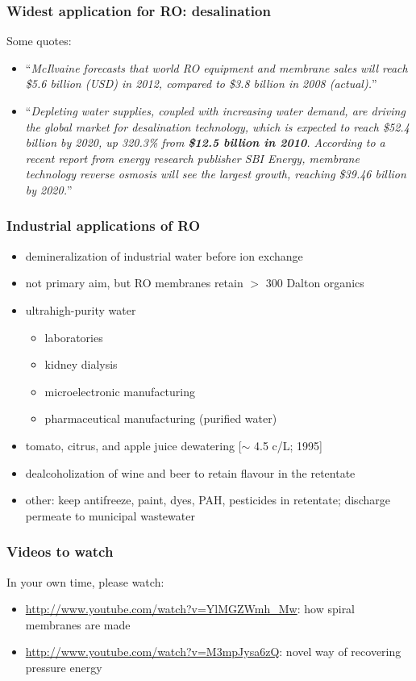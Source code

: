 \begin{frame}\frametitle{Widest application for RO: desalination}
	Some quotes:
	\begin{itemize}
		\item	``\emph{McIlvaine forecasts that world RO equipment and membrane sales will reach \$5.6 billion (USD) in 2012, compared to \$3.8 billion in 2008 (actual).}''
		\item	``\emph{Depleting water supplies, coupled with increasing water demand, are driving the global market for desalination technology, which is expected to reach \$52.4 billion by 2020, up 320.3\% from \textbf{\$12.5 billion in 2010}. According to a recent report from energy research publisher SBI Energy, membrane technology reverse osmosis will see the largest growth, reaching \$39.46 billion by 2020.}''
	\end{itemize}	
\end{frame}

\begin{frame}\frametitle{Industrial applications of RO}
	\begin{itemize}
		\item	demineralization of industrial water before ion exchange
		\item	not primary aim, but RO membranes retain $>$ 300 Dalton organics %
		\item	ultrahigh-purity water
		 	\begin{itemize}
		 		\item	laboratories
		 		\item	kidney dialysis
		 		\item	microelectronic manufacturing
		 		\item	pharmaceutical manufacturing (purified water)
		 	\end{itemize}
		 \item	tomato, citrus, and apple juice dewatering [$\sim$ 4.5 c/L; 1995]
		 \item	dealcoholization of wine and beer to retain flavour in the retentate
		 \item	other: keep antifreeze, paint, dyes, PAH, pesticides in retentate; discharge permeate to municipal wastewater
	\end{itemize}
\end{frame}

\begin{frame}\frametitle{Videos to watch}
	In your own time, please watch:
	
	\begin{itemize}
		\item	\href{http://www.youtube.com/watch?v=YlMGZWmh\_Mw}{http://www.youtube.com/watch?v=YlMGZWmh\_Mw}: how spiral membranes are made
		\item	\href{http://www.youtube.com/watch?v=M3mpJysa6zQ}{http://www.youtube.com/watch?v=M3mpJysa6zQ}: novel way of recovering pressure energy
	\end{itemize}
\end{frame}

